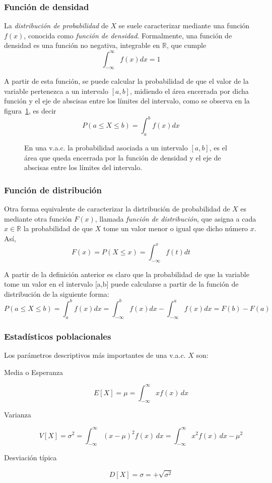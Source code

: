 \subsubsection{Función de densidad}
La \emph{distribución de probabilidad} de $X$ se suele caracterizar mediante una función $f(x)$, conocida como
\emph{función de densidad}. Formalmente, una función de densidad es una función no negativa, integrable en $\mathbb{R}$,
que cumple 
\[
\int_{ - \infty }^\infty  {f(x)dx = 1} 
\]

A partir de esta función, se puede calcular la probabilidad de que el valor de la variable pertenezca a un intervalo
$[a,b]$, midiendo el área encerrada por dicha función y el eje de abscisas entre los límites del intervalo, como se
observa en la figura~\ref{g:probabilidadintervalo}, es decir
\[
P(a \le X \le b) = \int_a^b {f(x)dx}
\]

\begin{figure}[h!]
\centering
\scalebox{0.8}{} 
\caption{En una v.a.c. la probabilidad asociada a un intervalo $[a,b]$, es el área que queda encerrada por
la función de densidad y el eje de abscisas entre los límites del intervalo.}\label{g:probabilidadintervalo}
\end{figure}


\subsubsection{Función de distribución}
Otra forma equivalente de caracterizar la distribución de probabilidad de $X$ es mediante otra función $F(x)$, llamada
\emph{función de distribución}, que asigna a cada $x\in \mathbb{R}$ la probabilidad de que $X$ tome un valor menor o
igual que dicho número $x$. Así,
\[
F(x) = P(X \le x) = \int_{ - \infty }^x {f(t)dt}
\]

A partir de la definición anterior es claro que la probabilidad de que la variable tome un valor en el intervalo [a,b]
puede calcularse a partir de la función de distribución de la siguiente forma:
\[
P(a \le X \le b) = \int_a^b {f(x)dx = } \int_{ - \infty }^b {f(x)dx - } \int_{ - \infty }^a {f(x)dx = } F(b) - F(a)
\]


\subsubsection{Estadísticos poblacionales}
Los parámetros descriptivos más importantes de una v.a.c. $X$ son:
\begin{description}
\item [Media o Esperanza]
\[
E[X]=\mu  = \int_{ - \infty }^\infty  {xf(x)\,dx}
\]

\item [Varianza]
\[
V[X]=\sigma ^2  = \int_{ - \infty }^\infty {(x - \mu )^2 f(x)\,dx =
} \int_{ - \infty }^\infty  {x^2  f(x)\,dx - \mu ^2 }
\]

\item [Desviación típica]
\[
D[X]=\sigma  =  + \sqrt {\sigma ^2 }
\]
\end{description}

